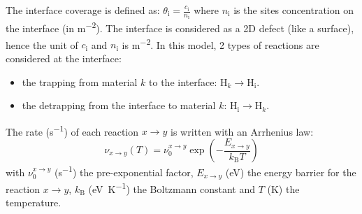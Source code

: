 The interface coverage is defined as: $\theta_\mathrm{i}=\frac{c_\mathrm{i}}{n_\mathrm{i}}$ where $n_\mathrm{i}$ is the sites concentration on the interface (in \si{m^{-2}}).
The interface is considered as a 2D defect (like a surface), hence the unit of $c_\mathrm{i}$ and $n_\mathrm{i}$ is \si{m^{-2}}.
\indent In this model, 2 types of reactions are considered at the interface:
\begin{itemize}
    \item the trapping from material $k$ to the interface: $\mathrm{H}_k \rightarrow \mathrm{H_i}$.
    \item the detrapping from the interface to material $k$: $\mathrm{H_i} \rightarrow \mathrm{H}_k$.
\end{itemize}
The rate (\si{s^{-1}}) of each reaction $x\rightarrow y$ is written with an Arrhenius law: 
\begin{equation}
\nu_{x\rightarrow y}(T)=\nu_0^{x\rightarrow y}\exp\left(-\frac{E_{x\rightarrow y}}{k_\mathrm{B}T}\right)
\label{eq:TST}
\end{equation}
with $\nu_0^{x\rightarrow y}$ (\si{s^{-1}}) the pre-exponential factor, $E_{x\rightarrow y}$ (\si{eV}) the energy barrier for the reaction $x\rightarrow y$, $k_\mathrm{B}$ (\si{eV.K^{-1}}) the Boltzmann constant and $T$ (\si{K}) the temperature.

